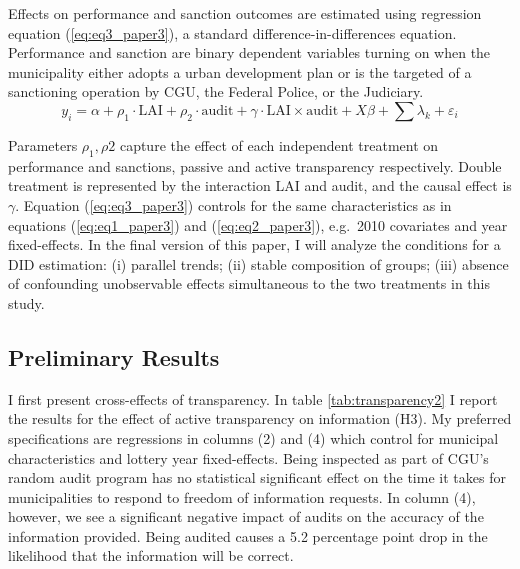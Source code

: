 \documentclass[11pt]{article}
\newcommand{\refp}[1]{(\ref{#1})}
\begin{document}
Effects on performance and sanction outcomes are estimated using regression equation \refp{eq:eq3_paper3}, a standard difference-in-differences equation. Performance and sanction are binary dependent variables turning on when the municipality either adopts a urban development plan or is the targeted of a sanctioning operation by CGU, the Federal Police, or the Judiciary.
\begin{equation} \label{eq:eq3_paper3}
  y_{i} = \alpha + \rho_{1} \cdot \text{LAI} + \rho_{2} \cdot \text{audit} + \gamma \cdot \text{LAI} \times \text{audit} + X \beta + \sum \lambda_{k} + \varepsilon_{i}
\end{equation}

Parameters $\rho_{1}, \rho{2}$ capture the effect of each independent treatment on performance and sanctions, passive and active transparency respectively. Double treatment is represented by the interaction LAI and audit, and the causal effect is $\gamma$. Equation \refp{eq:eq3_paper3} controls for the same characteristics as in equations \refp{eq:eq1_paper3} and \refp{eq:eq2_paper3}, e.g.~2010 covariates and year fixed-effects. In the final version of this paper, I will analyze the conditions for a DID estimation: (i) parallel trends; (ii) stable composition of groups; (iii) absence of confounding unobservable effects simultaneous to the two treatments in this study.

\subsection{Preliminary Results} \label{subsec:results_paper3}

I first present cross-effects of transparency. In table \ref{tab:transparency2} I report the results for the effect of active transparency on information (H3). My preferred specifications are regressions in columns (2) and (4) which control for municipal characteristics and lottery year fixed-effects. Being inspected as part of CGU's random audit program has no statistical significant effect on the time it takes for municipalities to respond to freedom of information requests. In column (4), however, we see a significant negative impact of audits on the accuracy of the information provided. Being audited causes a 5.2 percentage point drop in the likelihood that the information will be correct.\\


\end{document}
